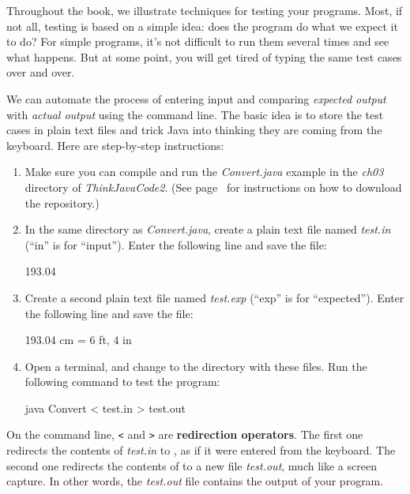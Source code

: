 Throughout the book, we illustrate techniques for testing your programs.
Most, if not all, testing is based on a simple idea: does the program do what we expect it to do?
For simple programs, it's not difficult to run them several times and see what happens.
But at some point, you will get tired of typing the same test cases over and over.

We can automate the process of entering input and comparing {\em expected output} with {\em actual output} using the command line.
The basic idea is to store the test cases in plain text files and trick Java into thinking they are coming from the keyboard.
Here are step-by-step instructions:

\begin{enumerate}

\item Make sure you can compile and run the {\it Convert.java} example in the {\it ch03} directory of {\it ThinkJavaCode2}.
(See page~\pageref{code} for instructions on how to download the repository.)

\item In the same directory as {\it Convert.java}, create a plain text file named {\it test.in} (``in'' is for ``input'').
Enter the following line and save the file:

\begin{stdout}
193.04
\end{stdout}

\item Create a second plain text file named {\it test.exp} (``exp'' is for ``expected'').
Enter the following line and save the file:

\begin{stdout}
193.04 cm = 6 ft, 4 in
\end{stdout}

\item Open a terminal, and change to the directory with these files.
Run the following command to test the program:

\begin{stdout}
java Convert < test.in > test.out
\end{stdout}

\end{enumerate}


On the command line, {\tt <} and {\tt >} are {\bf redirection operators}.
The first one redirects the contents of {\it test.in} to , as if it were entered from the keyboard.
The second one redirects the contents of  to a new file {\it test.out}, much like a screen capture.
In other words, the {\it test.out} file contains the output of your program.

